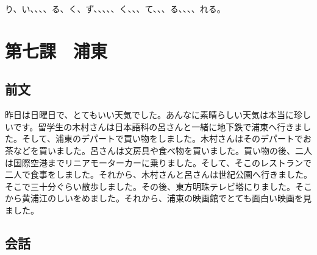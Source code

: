 \documentclass[a5j]{ltjtarticle}
\begin{document}
\begin{onehalfspace}
  り、い、、、、る、く、ず、、、、、く、、、て、、、る、、、、れる。
\end{onehalfspace}

\section*{第七課　浦東}

\subsection*{前文}

昨日は日曜日で、とてもいい天気でした。あんなに素晴らしい天気は本当に珍しいです。留学生の木村さんは日本語科の呂さんと一緒に地下鉄で浦東へ行きました。そして、浦東のデパートで買い物をしました。木村さんはそのデパートでお茶などを買いました。呂さんは文房具や食べ物を買いました。買い物の後、二人は国際空港までリニアモーターカーに乗りました。そして、そこのレストランで二人で食事をしました。それから、木村さんと呂さんは世紀公園へ行きました。そこで三十分ぐらい散歩しました。その後、東方明珠テレビ塔にりました。そこから黄浦江のしいをめました。それから、浦東の映画館でとても面白い映画を見ました。

\subsection*{会話}
\end{document}

